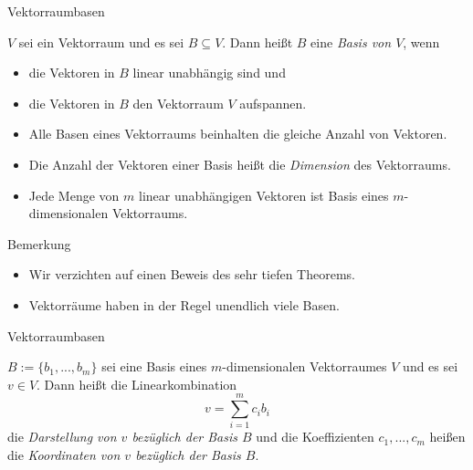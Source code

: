 \documentclass[
  8pt,
  ignorenonframetext,
]{beamer}
\providecommand{\tightlist}{%
  \setlength{\itemsep}{0pt}\setlength{\parskip}{0pt}}
\begin{document}
\begin{frame}{Vektorraumbasen}
\protect\hypertarget{vektorraumbasen-1}{}
\small
\begin{definition}[Basis]
$V$ sei ein Vektorraum und es sei $B \subseteq V$. Dann heißt $B$ eine
\textit{Basis von $V$}, wenn
\begin{itemize}
\item die Vektoren in $B$ linear unabhängig sind und
\item die Vektoren in $B$ den Vektorraum $V$ aufspannen.
\end{itemize}
\end{definition}

\begin{theorem}
\begin{itemize}
\justifying
\normalfont
\item Alle Basen eines Vektorraums beinhalten die gleiche Anzahl von Vektoren.
\item Die Anzahl der Vektoren einer Basis heißt die \textit{Dimension} des Vektorraums.
\item Jede Menge von $m$ linear unabhängigen Vektoren ist Basis eines $m$-dimensionalen Vektorraums.
\end{itemize}
\end{theorem}

Bemerkung

\begin{itemize}
\tightlist
\item
  Wir verzichten auf einen Beweis des sehr tiefen Theorems.
\item
  Vektorräume haben in der Regel unendlich viele Basen.
\end{itemize}
\end{frame}

\begin{frame}{Vektorraumbasen}
\protect\hypertarget{vektorraumbasen-2}{}
\small

\begin{definition}
\justifying
$B := \{b_1,...,b_m\}$ sei eine Basis eines $m$-dimensionalen Vektorraumes  $V$
und es sei $v \in V$. Dann heißt die Linearkombination
\begin{equation}
v = \sum_{i = 1}^m c_i b_i
\end{equation}
die \textit{Darstellung von $v$ bezüglich der Basis $B$} und die Koeffizienten
$c_1,...,c_m$ heißen die \textit{Koordinaten von $v$ bezüglich der Basis $B$}.
\end{definition}
\end{frame}
\end{document}
